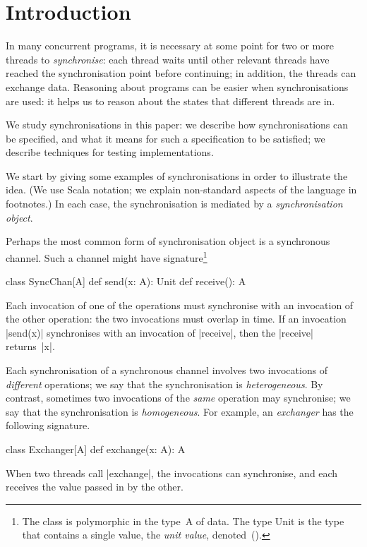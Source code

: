 \section{Introduction}

In many concurrent programs, it is necessary at some point for two or more
threads to \emph{synchronise}: each thread waits until other relevant threads
have reached the synchronisation point before continuing; in addition, the
threads can exchange data.  Reasoning about programs can be easier when
synchronisations are used: it helps us to reason about the states that
different threads are in.

We study synchronisations in this paper: we describe how synchronisations can
be specified, and what it means for such a specification to be satisfied; we
describe techniques for testing implementations.

We start by giving some examples of synchronisations in order to illustrate
the idea.  (We use Scala notation; we explain non-standard aspects of the
language in footnotes.)  In each case, the synchronisation is mediated by a
\emph{synchronisation object}.

Perhaps the most common form of synchronisation object is a synchronous
channel.  Such a channel might have signature\footnote{The class is
  polymorphic in the type~{\scalashape A} of data.  The type {\scalashape
    Unit} is the type that contains a single value, the \emph{unit value},
  denoted~{\scalashape ()}.}
%
\begin{scala}
class SyncChan[A]{
  def send(x: A): Unit
  def receive(): A
}
\end{scala}
%
Each invocation of one of the operations must synchronise with an invocation
of the other operation: the two invocations must overlap in time.  If an
invocation |send(x)| synchronises with an invocation of |receive|, then the
|receive| returns~|x|.

Each synchronisation of a synchronous channel involves two invocations of
\emph{different} operations; we say that the synchronisation is
\emph{heterogeneous}.  By contrast, sometimes two invocations of the
\emph{same} operation may synchronise; we say that the synchronisation is
\emph{homogeneous}.  For example, an \emph{exchanger} has the following
signature.
%
\begin{scala}
class Exchanger[A]{
  def exchange(x: A): A
}
\end{scala}
%
When two threads call |exchange|, the invocations can synchronise, and each
receives the value passed in by the other.

